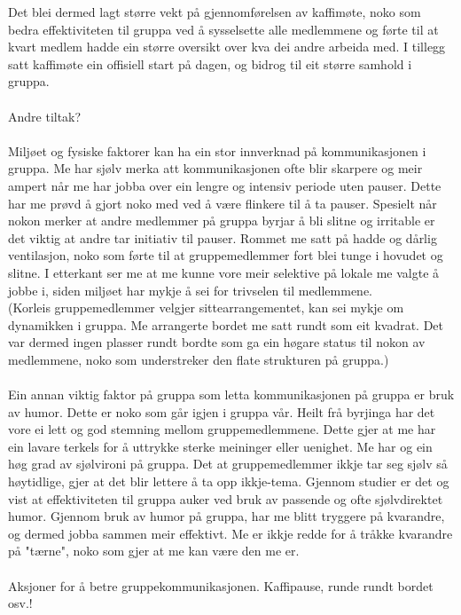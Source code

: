Det blei dermed lagt større vekt på gjennomførelsen av kaffimøte, noko som bedra effektiviteten til gruppa ved å sysselsette alle medlemmene og førte til at kvart medlem hadde ein større oversikt over kva dei andre arbeida med. I tillegg satt kaffimøte ein offisiell start på dagen, og bidrog til eit større samhold i gruppa. 
\\
\\
Andre tiltak?
\\
\\
Miljøet og fysiske faktorer kan ha ein stor innverknad på kommunikasjonen i gruppa. Me har sjølv merka att kommunikasjonen ofte blir skarpere og meir ampert når me har jobba over ein lengre og intensiv periode uten pauser. Dette har me prøvd å gjort noko med ved å være flinkere til å ta pauser. Spesielt når nokon merker at andre medlemmer på gruppa byrjar å bli slitne og irritable er det viktig at andre tar initiativ til pauser. 
Rommet me satt på hadde og dårlig ventilasjon, noko som førte til at gruppemedlemmer fort blei tunge i hovudet og slitne. I etterkant ser me at me kunne vore meir selektive på lokale me valgte å jobbe i, siden miljøet har mykje å sei for trivselen til medlemmene.
\\
(Korleis gruppemedlemmer velgjer sittearrangementet, kan sei mykje om dynamikken i gruppa. Me arrangerte bordet me satt rundt som eit kvadrat. Det var dermed ingen plasser rundt bordte som ga ein høgare status til nokon av medlemmene, noko som understreker den flate strukturen på gruppa.)
\\
\\
Ein annan viktig faktor på gruppa som letta kommunikasjonen på gruppa er bruk av humor. Dette er noko som går igjen i gruppa vår. Heilt frå byrjinga har det vore ei lett og god stemning mellom gruppemedlemmene. Dette gjer at me har ein lavare terkels for å uttrykke sterke meininger eller uenighet. Me har og ein høg grad av sjølvironi på gruppa. Det at gruppemedlemmer ikkje tar seg sjølv så høytidlige, gjer at det blir lettere å ta opp ikkje-tema. Gjennom studier er det og vist at effektiviteten til gruppa auker ved bruk av passende og ofte sjølvdirektet humor. Gjennom bruk av humor på gruppa, har me blitt tryggere på kvarandre, og dermed jobba sammen meir effektivt. Me er ikkje redde for å tråkke kvarandre på "tærne", noko som gjer at me kan være den me er. 
\\
\\
Aksjoner for å betre gruppekommunikasjonen. Kaffipause, runde rundt bordet osv.!

